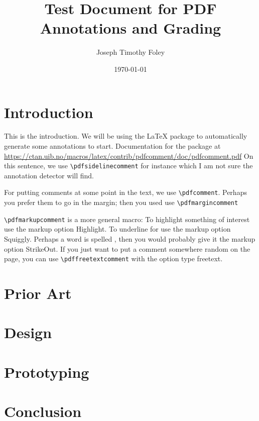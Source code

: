 \documentclass[11pt,a4paper]{article}
\title{Test Document for PDF Annotations and Grading}
\author{Joseph Timothy Foley}
\date{\today}
\begin{document}
\maketitle{}
\newcommand{\texmacro}[1]{\texttt{\textbackslash#1}}
\section{Introduction}
This is the introduction.
We will be using the  \LaTeX{} package to automatically generate some annotations to start.
Documentation for the package at \url{https://ctan.uib.no/macros/latex/contrib/pdfcomment/doc/pdfcomment.pdf}
On this sentence, we use \texmacro{pdfsidelinecomment} for instance which I am not sure the annotation detector will find.

For putting comments at some point in the text, we use \texmacro{pdfcomment}.
Perhaps you prefer them to go in the margin; then you used use \texmacro{pdfmargincomment}

\texmacro{pdfmarkupcomment} is a more general macro:
To highlight something of interest  use the markup option Highlight.
To underline for  use the markup option Squiggly.
Perhaps a word is spelled , then you would probably give it the markup option StrikeOut.
If you just want to put a comment somewhere random on the page, you can use \texmacro{pdffreetextcomment} with the option type freetext. 

\section{Prior Art}
\lipsum[2]
\section{Design}
\lipsum[3]
\section{Prototyping}
\lipsum[4]
\section{Conclusion}
\lipsum[5]
\end{document}
